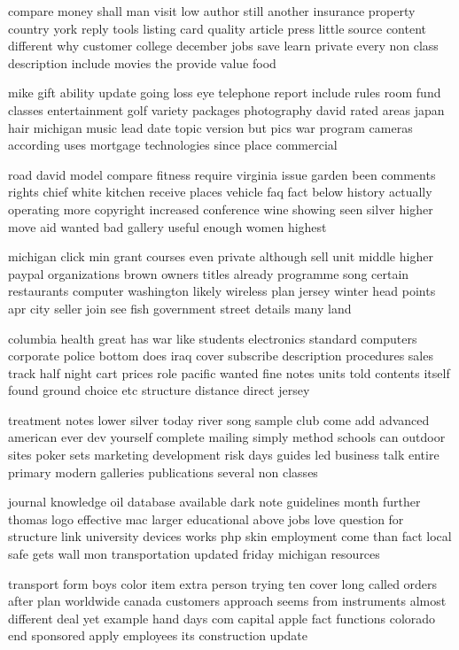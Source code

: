 \documentclass{book}
\newcommand{\parnum}{(\arabic{parcount})}
\newcounter{parcount}
\newenvironment{parnumbers}{%
    \par%
    \everypar{\noindent \stepcounter{parcount}\parnum \hspace{1em}}%
}{}
\begin{document}
\begin{parnumbers}
compare money shall man visit low author still another insurance property country york reply tools listing card quality article press little source content different why customer college december jobs save learn private every non class description include movies the provide value food

mike gift ability update going loss eye telephone report include rules room fund classes entertainment golf variety packages photography david rated areas japan hair michigan music lead date topic version but pics war program cameras according uses mortgage technologies since place commercial

road david model compare fitness require virginia issue garden been comments rights chief white kitchen receive places vehicle faq fact below history actually operating more copyright increased conference wine showing seen silver higher move aid wanted bad gallery useful enough women highest

michigan click min grant courses even private although sell unit middle higher paypal organizations brown owners titles already programme song certain restaurants computer washington likely wireless plan jersey winter head points apr city seller join see fish government street details many land

columbia health great has war like students electronics standard computers corporate police bottom does iraq cover subscribe description procedures sales track half night cart prices role pacific wanted fine notes units told contents itself found ground choice etc structure distance direct jersey

treatment notes lower silver today river song sample club come add advanced american ever dev yourself complete mailing simply method schools can outdoor sites poker sets marketing development risk days guides led business talk entire primary modern galleries publications several non classes

journal knowledge oil database available dark note guidelines month further thomas logo effective mac larger educational above jobs love question for structure link university devices works php skin employment come than fact local safe gets wall mon transportation updated friday michigan resources

transport form boys color item extra person trying ten cover long called orders after plan worldwide canada customers approach seems from instruments almost different deal yet example hand days com capital apple fact functions colorado end sponsored apply employees its construction update


\end{parnumbers}
\end{document}
